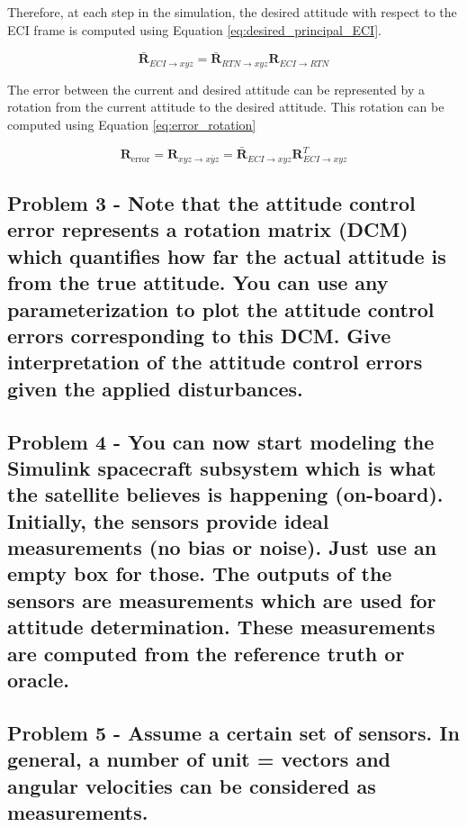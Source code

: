 Therefore, at each step in the simulation, the desired attitude with respect to the ECI frame is computed using Equation \ref{eq:desired_principal_ECI}.

\begin{equation} \label{eq:desired_principal_ECI}
    \boldsymbol{\bar{R}}_{ECI \rightarrow xyz} = \boldsymbol{\bar{R}}_{RTN \rightarrow xyz} \boldsymbol{R}_{ECI \rightarrow RTN}
\end{equation}

The error between the current and desired attitude can be represented by a rotation from the current attitude to the desired attitude. This rotation can be computed using Equation \ref{eq:error_rotation}

\begin{equation} \label{eq:error_rotation}
    \boldsymbol{R}_{\text{error}} = \boldsymbol{R}_{xyz \rightarrow \overline{xyz}} = \boldsymbol{\bar{R}}_{ECI \rightarrow xyz} \boldsymbol{R}_{ECI \rightarrow xyz}^T
\end{equation}

\subsection{Problem 3 - Note that the attitude control error represents a rotation matrix (DCM) which quantifies how far the actual attitude is from the true attitude. You can use any parameterization to plot the attitude control errors corresponding to this DCM. Give interpretation of the attitude control errors given the applied disturbances.}

\subsection{Problem 4 - You can now start modeling the Simulink spacecraft subsystem which is what the satellite believes is happening (on-board). Initially, the sensors provide ideal measurements (no bias or noise). Just use an empty box for those. The outputs of the sensors are measurements which are used for attitude determination. These measurements are computed from the reference truth or oracle.}

\subsection{Problem 5 - Assume a certain set of sensors. In general, a number of unit = vectors and angular velocities can be considered as measurements.}

